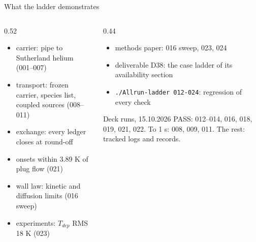 \documentclass[aspectratio=169,10pt]{beamer}
\begin{document}
\begin{frame}[t]{What the ladder demonstrates}
  \begin{columns}[T,onlytextwidth]
    \begin{column}{0.52\textwidth}
      \begin{itemize}
        \item carrier: pipe to Sutherland helium (001--007)
        \item transport: frozen carrier, species list, coupled sources (008--011)
        \item exchange: every ledger closes at round-off
        \item onsets within 3.89 K of plug flow (021)
        \item wall law: kinetic and diffusion limits (016 sweep)
        \item experiments: $T_{dep}$ RMS 18 K (023)
      \end{itemize}
    \end{column}
    \begin{column}{0.44\textwidth}
      \begin{itemize}
        \item methods paper: 016 sweep, 023, 024
        \item deliverable D38: the case ladder of its availability section
        \item \texttt{./Allrun-ladder 012-024}: regression of every check
      \end{itemize}
      \vspace{0.4em}
      \begin{block}{Deck runs, 15.10.2026}
        \small PASS: 012--014, 016, 018, 019, 021, 022. To 1 s: 008, 009, 011. The rest: tracked logs and records.
      \end{block}
    \end{column}
  \end{columns}
\end{frame}
\end{document}
